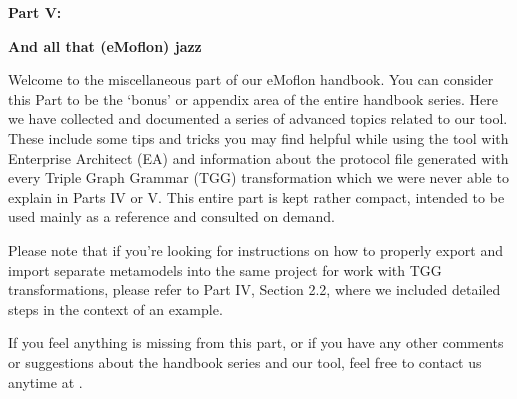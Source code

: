 \vspace*{2cm}

{\bf \huge Part V:}
\vspace{1cm}

{\Huge \bf And all that (eMoflon) jazz}
\vspace{1cm}
\label{chap:misc}

\genHeader

Welcome to the miscellaneous part of our eMoflon handbook. You can consider this
Part to be the `bonus' or appendix area of the entire handbook series. Here we have collected and documented a series of advanced topics related to our tool. These include some tips and tricks you may find helpful while using the tool with
Enterprise Architect (EA) and information about the protocol file generated with every
Triple Graph Grammar (TGG) transformation which we were never able to explain in Parts IV or V. This entire part is kept rather compact, intended to be used
mainly as a reference and consulted on demand.

Please note that if you're looking for instructions on how to properly export and import separate metamodels into the same project for work with TGG
transformations, please refer to Part IV, Section 2.2, where we included detailed steps in the context of
an example.

If you feel anything is missing from this part, or if you have any other comments or suggestions about the handbook series and our tool, feel free to contact us
anytime at \eMoflonContact.

 














